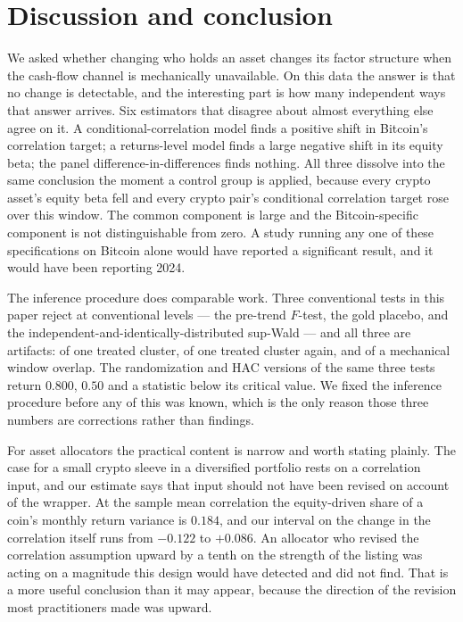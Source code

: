 \documentclass[12pt,a4paper]{article}
\begin{document}
\section{Discussion and conclusion}\label{sec:conclusion}

We asked whether changing who holds an asset changes its factor structure when the cash-flow channel is mechanically unavailable. On this data the answer is that no change is detectable, and the interesting part is how many independent ways that answer arrives. Six estimators that disagree about almost everything else agree on it. A conditional-correlation model finds a positive shift in Bitcoin's correlation target; a returns-level model finds a large negative shift in its equity beta; the panel difference-in-differences finds nothing. All three dissolve into the same conclusion the moment a control group is applied, because every crypto asset's equity beta fell and every crypto pair's conditional correlation target rose over this window. The common component is large and the Bitcoin-specific component is not distinguishable from zero. A study running any one of these specifications on Bitcoin alone would have reported a significant result, and it would have been reporting 2024.

The inference procedure does comparable work. Three conventional tests in this paper reject at conventional levels — the pre-trend $F$-test, the gold placebo, and the independent-and-identically-distributed sup-Wald — and all three are artifacts: of one treated cluster, of one treated cluster again, and of a mechanical window overlap. The randomization and HAC versions of the same three tests return $0.800$, $0.50$ and a statistic below its critical value. We fixed the inference procedure before any of this was known, which is the only reason those three numbers are corrections rather than findings.

For asset allocators the practical content is narrow and worth stating plainly. The case for a small crypto sleeve in a diversified portfolio rests on a correlation input, and our estimate says that input should not have been revised on account of the wrapper. At the sample mean correlation the equity-driven share of a coin's monthly return variance is
$0.184$, and our interval on the change in the correlation itself runs from $-0.122$ to $+0.086$. An allocator who revised the correlation assumption upward by a tenth on the strength of the listing was acting on a magnitude this design would have detected and did not find. That is a more useful conclusion than it may appear, because the direction of the revision most practitioners made was upward.
\end{document}
